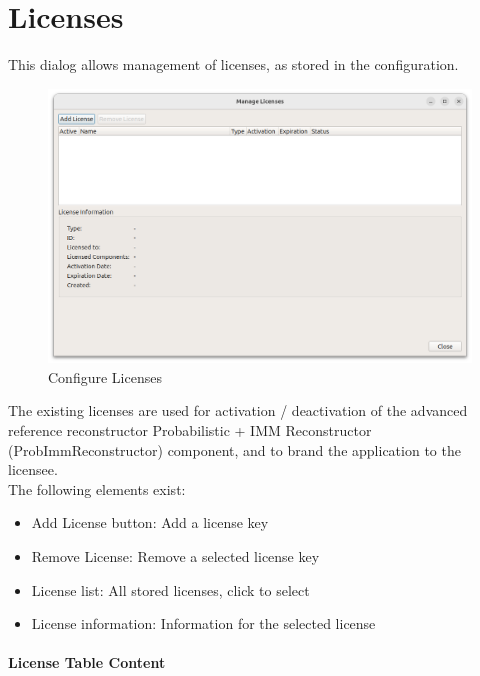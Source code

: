 \section{Licenses}
\label{sec:ui_configure_licenses}


This dialog allows management of licenses, as stored in the configuration. \\

\begin{figure}[H]
\hspace*{-1cm}
    \includegraphics[width=17cm]{figures/configure_licenses.png}
  \caption{Configure Licenses}
\end{figure}

The existing licenses are used for activation / deactivation of the advanced reference reconstructor Probabilistic + IMM Reconstructor (ProbImmReconstructor) component, and to brand the application to the licensee. 
\ \\

The following elements exist:

\begin{itemize}
\item Add License button: Add a license key 
\item Remove License: Remove a selected license key
\item License list: All stored licenses, click to select
\item License information: Information for the selected license
\end{itemize}

\paragraph {License Table Content}

